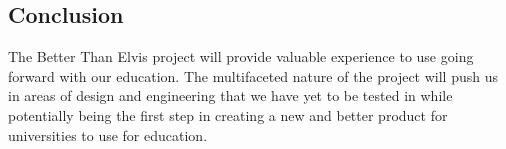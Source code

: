 \subsection{Conclusion}
	The Better Than Elvis project will provide valuable experience to use going forward with our education. The multifaceted nature of the project will push us in areas of design and engineering that we have yet to be tested in while potentially being the first step in creating a new and better product for universities to use for education.